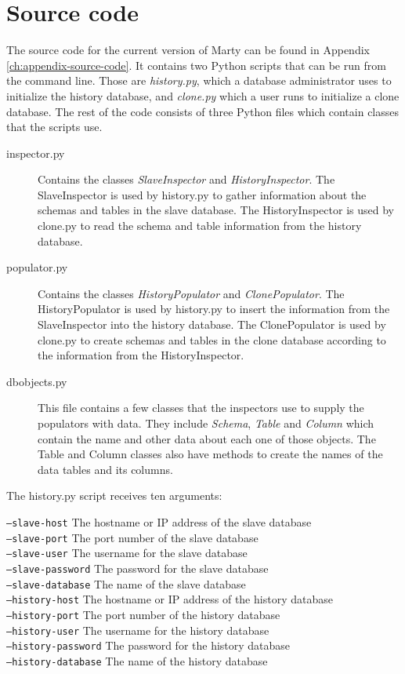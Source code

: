 \section{Source code}
The source code for the current version of Marty can be found in Appendix \ref{ch:appendix-source-code}.
It contains two Python scripts that can be run from the command line.
Those are \textit{history.py}, which a database administrator uses to initialize the history database, and \textit{clone.py} which a user runs to initialize a clone database.
The rest of the code consists of three Python files which contain classes that the scripts use.

\begin{description}
  \item[inspector.py]
    Contains the classes \textit{SlaveInspector} and \textit{HistoryInspector}.
    The SlaveInspector is used by history.py to gather information about the schemas and tables in the slave database.
    The HistoryInspector is used by clone.py to read the schema and table information from the history database.
  \item[populator.py]
    Contains the classes \textit{HistoryPopulator} and \textit{ClonePopulator}.
    The HistoryPopulator is used by history.py to insert the information from the SlaveInspector into the history database.
    The ClonePopulator is used by clone.py to create schemas and tables in the clone database according to the information from the HistoryInspector.
  \item[dbobjects.py]
    This file contains a few classes that the inspectors use to supply the populators with data.
    They include \textit{Schema}, \textit{Table} and \textit{Column} which contain the name and other data about each one of those objects.
    The Table and Column classes also have methods to create the names of the data tables and its columns.
\end{description}

The history.py script receives ten arguments:

\texttt{---slave-host} The hostname or IP address of the slave database \\
\texttt{---slave-port} The port number of the slave database \\
\texttt{---slave-user} The username for the slave database \\
\texttt{---slave-password} The password for the slave database \\
\texttt{---slave-database} The name of the slave database \\
\texttt{---history-host} The hostname or IP address of the history database \\
\texttt{---history-port} The port number of the history database \\
\texttt{---history-user} The username for the history database \\
\texttt{---history-password} The password for the history database \\
\texttt{---history-database} The name of the history database

